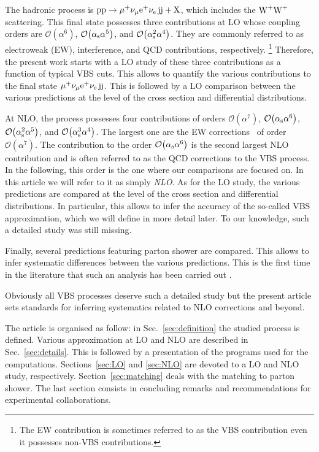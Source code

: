 The hadronic process is $\text{p}\text{p}\to\mu^+\nu_\mu{\rm e}^+\nu_{\rm e}\,\text{j}\text{j}+\mathrm{X}$, which includes the $\text{W}^+\text{W}^+$ scattering.
This final state possesses three contributions at LO whose coupling orders are $\mathcal{O}{\left(\alpha^{6}\right)}$, $\mathcal{O}{\left(\alpha_{\rm s}\alpha^{5}\right)}$, and $\mathcal{O}{\left(\alpha_\text{s}^{2}\alpha^{4}\right)}$.
They are commonly referred to as electroweak (EW), interference, and QCD contributions, respectively.%
\footnote{The EW contribution is sometimes referred to as the VBS contribution even it possesses non-VBS contributions.}
Therefore, the present work starts with a LO study of these three contributions as a function of typical VBS cuts.
This allows to quantify the various contributions to the final state $\mu^+\nu_\mu{\rm e}^+\nu_{\rm e}\,\text{j}\text{j}$.
This is followed by a LO comparison between the various predictions at the level of the cross section and differential distributions.

At NLO, the process possesses four contributions of orders $\mathcal{O}{\left(\alpha^{7}\right)}$, $\mathcal{O}{\left(\alpha_\text{s}\alpha^{6}\right)}$, $\mathcal{O}{\left(\alpha_\text{s}^{2}\alpha^{5}\right)}$, and $\mathcal{O}{\left(\alpha_\text{s}^{3}\alpha^{4}\right)}$.
The largest one are the EW corrections~\cite{Biedermann:2017bss,Biedermann:2016yds} of order $\mathcal{O}{\left(\alpha^{7}\right)}$.
The contribution to the order $\mathcal{O}{\left(\alpha_\text{s}\alpha^{6}\right)}$ is the second largest NLO contribution and is often referred to as the QCD corrections to the VBS process.
In the following, this order is the one where our comparisons are focused on.
In this article we will refer to it as simply \emph{NLO}.
As for the LO study, the various predictions are compared at the level of the cross section and differential distributions.
In particular, this allows to infer the accuracy of the so-called VBS approximation, which we will define in more detail later.
To our knowledge, such a detailed study was still missing.

Finally, several predictions featuring parton shower are compared.
This allows to infer systematic differences between the various predictions.
This is the first time in the literature that such an analysis has been carried out .

Obviously all VBS processes deserve such a detailed study but the present article sets standards for inferring systematics related to NLO corrections and beyond.


The article is organised as follow:
in Sec.~\ref{sec:definition} the studied process is defined.
Various approximation at LO and NLO are described in Sec.~\ref{sec:details}.
This is followed by a presentation of the programs used for the computations.
Sections~\ref{sec:LO} and \ref{sec:NLO} are devoted to a LO and NLO study, respectively.
Section~\ref{sec:matching} deals with the matching to parton shower.
The last section consists in concluding remarks and recommendations for experimental collaborations.
